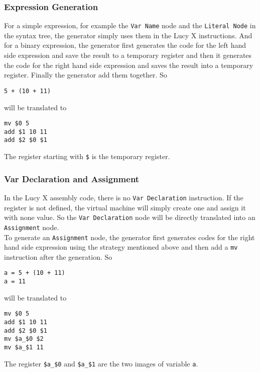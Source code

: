 \subsubsection{Expression Generation}
For a simple expression, for example the \texttt{Var Name} node and the \texttt{Literal Node} in the syntax tree, the generator simply uses them in the Lucy X instructions. And for a binary expression, the generator first generates the code for the left hand side expression and save the result to a temporary register and then it generates the code for the right hand side expression and saves the result into a temporary register. Finally the generator add them together. So
\begin{lstlisting}
5 + (10 + 11)
\end{lstlisting}
will be translated to
\begin{lstlisting}[language=LucyX]
mv $0 5
add $1 10 11
add $2 $0 $1
\end{lstlisting}
The register starting with \texttt{\$} is the temporary register.
\subsubsection{Var Declaration and Assignment}
In the Lucy X assembly code, there is no \texttt{Var Declaration} instruction. If the register is not defined, the virtual machine will simply create one and assign it with none value. So the \texttt{Var Declaration} node will be directly translated into an \texttt{Assignment} node. \\
To generate an \texttt{Assignment} node, the generator first generates codes for the right hand side expression using the strategy mentioned above and then add a \texttt{mv} instruction after the generation. So
\begin{lstlisting}
a = 5 + (10 + 11)
a = 11
\end{lstlisting}
will be translated to
\begin{lstlisting}[language=LucyX]
mv $0 5
add $1 10 11
add $2 $0 $1
mv $a_$0 $2
mv $a_$1 11
\end{lstlisting}
The register \texttt{\$a\_\$0} and \texttt{\$a\_\$1} are the two images of variable \texttt{a}.
